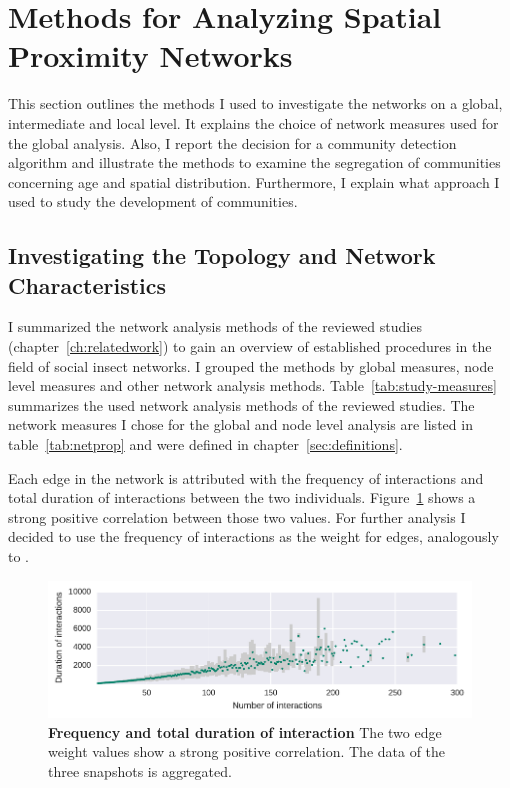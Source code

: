 \section{Methods for Analyzing Spatial Proximity Networks}
This section outlines the methods I used to investigate the networks on a global, intermediate and local level.
It explains the choice of network measures used for the global analysis.
Also, I report the decision for a community detection algorithm and illustrate the methods to examine the segregation of communities concerning age and spatial distribution.
Furthermore, I explain what approach I used to study the development of communities.

\subsection{Investigating the Topology and Network Characteristics}
\label{subsec:APmeasures}
I summarized the network analysis methods of the reviewed studies (chapter~\ref{ch:relatedwork}) to gain an overview of established procedures in the field of social insect networks. I grouped the methods by global measures, node level measures and other network analysis methods.
Table~\ref{tab:study-measures} summarizes the used network analysis methods of the reviewed studies.
The network measures I chose for the global and node level analysis are listed in table~\ref{tab:netprop} and were defined in chapter~\ref{sec:definitions}.

Each edge in the network is attributed with the frequency of interactions and total duration of interactions between the two individuals.
Figure~\ref{fig:fVSd} shows a strong positive correlation between those two values. For further analysis I decided to use the frequency of interactions as the weight for edges, analogously to \cite{mersch2013tracking,baracchi2014socio}.


\begin{figure}[htb]
	\centering
	\includegraphics[width=1.0\textwidth]{Figures/n3-freqVSduration}
	\caption[Frequency and total duration of interaction]{\textbf{Frequency and total duration of interaction} The two edge weight values show a strong positive correlation. The data of the three snapshots is aggregated.}
	\label{fig:fVSd}
\end{figure}

